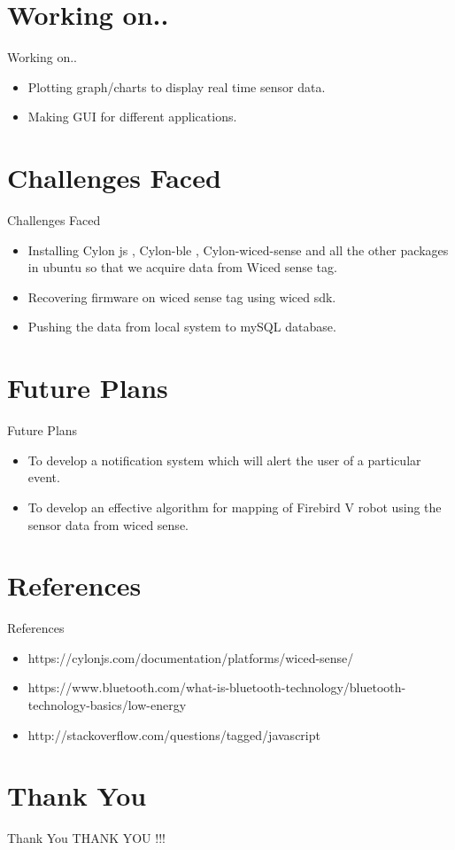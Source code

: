 \documentclass[10pt, a4paper]{beamer}
\begin{document}
\section{Working on..}
\begin{frame}{Working on..}
	\begin{itemize}
	  \item Plotting graph/charts to display real time sensor data.
	  \item Making GUI for different applications.
	\end{itemize}
\end{frame}

\section{Challenges Faced}
\begin{frame}{Challenges Faced}
	\begin{itemize}
		\item Installing Cylon js , Cylon-ble , Cylon-wiced-sense and all the other packages in ubuntu so that we acquire data from Wiced sense tag.
		\item Recovering firmware on wiced sense tag using wiced sdk.
		\item Pushing the data from local system to mySQL database.
	\end{itemize}
\end{frame}

\section{Future Plans}
\begin{frame}{Future Plans}
	\begin{itemize}
		\item To develop a notification system which will alert the user of a particular event.
		\item To develop an effective algorithm for mapping of Firebird V robot using the sensor data from wiced sense.
	\end{itemize}
\end{frame}

\section{References}
\begin{frame}{References}
	\begin{itemize}
		\item https://cylonjs.com/documentation/platforms/wiced-sense/
		\item https://www.bluetooth.com/what-is-bluetooth-technology/bluetooth-technology-basics/low-energy
		\item http://stackoverflow.com/questions/tagged/javascript
	\end{itemize}
\end{frame}

\section{Thank You}
\begin{frame}{Thank You}
	\centering THANK YOU !!!
\end{frame}
\end{document}
